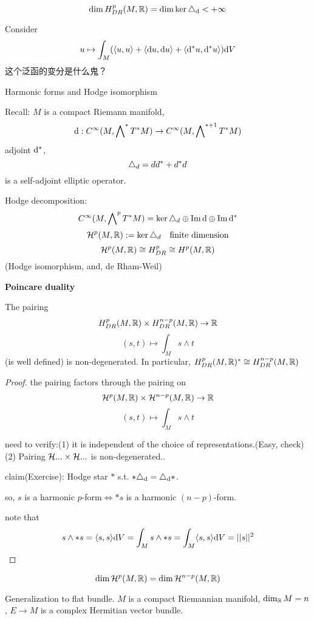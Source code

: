 \begin{cor}
$$\dim H^{p}_{DR}(M,\mathbb{R})=\dim\ker\triangle_{\mathrm{d}}<+\infty$$
\end{cor}

\begin{rem}Consider
$$u\mapsto \int_M(
  \langle u,u \rangle+
  \langle \mathrm{d} u,\mathrm{d} u \rangle+
  \langle \mathrm{d}^*u,\mathrm{d}^*u \rangle
)\mathrm{d} V$$
这个泛函的变分是什么鬼？
\end{rem}

Harmonic forms and Hodge isomorphism

Recall: $M$ is a compact Riemann manifold, 
$$\mathrm{d}:C^\infty(M,\bigwedge\nolimits^{*}T^*M)\to C^\infty(M,\bigwedge\nolimits^{*+1}T^*M)$$
adjoint $\mathrm{d}^*$,
$$\triangle_d=dd^*+d^*d$$
is a self-adjoint elliptic operator. 

Hodge decomposition:
$$C^\infty(M,\bigwedge\nolimits^{p}T^*M)=\ker\triangle_d\oplus\operatorname{Im} \mathrm{d}\oplus\operatorname{Im}\mathrm{d}^*$$
$$\mathcal{H}^p(M,\mathbb{R}):=\ker\triangle_d \quad\text{finite dimension}$$
$$\mathcal{H}^p(M,\mathbb{R})\cong H^p_{DR}\cong H^p(M,\mathbb{R})$$
(Hodge isomorphism, and, de Rham-Weil)

\textbf{Poincare duality}

\begin{thm}
The pairing 
$$H^p_{DR}(M,\mathbb{R})\times H^{n-p}_{DR}(M,\mathbb{R})\to\mathbb{R}$$
$$(s,t)\mapsto\int_M s\wedge t$$
(is well defined) is non-degenerated. In particular,
$H^p_{DR}(M,\mathbb{R})^*\cong H^{n-p}_{DR}(M,\mathbb{R})$
\end{thm}

\begin{proof}
the pairing factors through the pairing on 
$$\mathcal{H}^p(M,\mathbb{R})\times\mathcal{H}^{n-p}(M,\mathbb{R})\to\mathbb{R}$$
$$(s,t)\mapsto\int_Ms\wedge t$$

need to verify:(1) 
it is independent of the choice of representations.(Easy, check)
(2) Pairing $\mathcal{H}...\times\mathcal{H}...$ is non-degenerated..

claim(Exercise): Hodge star $*$ s.t. $*\triangle_{\mathrm{d}}=\triangle_{\mathrm{d}}*$.

so, $s$ is a harmonic $p$-form$\iff *s$ is a harmonic $(n-p)$-form. 

note that 
$$s\wedge *s=\langle s,s\rangle \mathrm{d} V
=\int_Ms\wedge *s=\int_M\langle s,s\rangle\mathrm{d} V=||s||^2
$$
\end{proof}

\begin{cor}
$$\dim\mathcal{H}^p(M,\mathbb{R})=\dim\mathcal{H}^{n-p}(M,\mathbb{R})$$
\end{cor}

Generalization to flat bundle. $M$ is a compact Riemannian manifold,
$\dim_{\mathbb{R}}M=n$, $E\to M$ is a complex Hermitian vector bundle.


